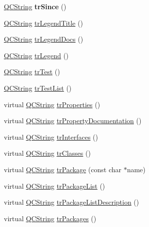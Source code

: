 \begin{DoxyCompactItemize}
\item 
\hypertarget{class_translator_polish_a20d10919ba8fcb87ea8aff4d2cb6f37d}{\hyperlink{class_q_c_string}{Q\-C\-String} {\bfseries tr\-Since} ()}\label{class_translator_polish_a20d10919ba8fcb87ea8aff4d2cb6f37d}

\item 
\hyperlink{class_q_c_string}{Q\-C\-String} \hyperlink{class_translator_polish_a7f4f24b82bfe41aeccff7758ce877838}{tr\-Legend\-Title} ()
\item 
\hyperlink{class_q_c_string}{Q\-C\-String} \hyperlink{class_translator_polish_a36810de513b643c28c93dd0873812891}{tr\-Legend\-Docs} ()
\item 
\hyperlink{class_q_c_string}{Q\-C\-String} \hyperlink{class_translator_polish_ac9030d6b3e6b640a112dcb18298f4494}{tr\-Legend} ()
\item 
\hyperlink{class_q_c_string}{Q\-C\-String} \hyperlink{class_translator_polish_a9a6cd1fdbadb3328f2a1158928d84d6e}{tr\-Test} ()
\item 
\hyperlink{class_q_c_string}{Q\-C\-String} \hyperlink{class_translator_polish_ab52ca375095ff8ebc3132b990b37a796}{tr\-Test\-List} ()
\item 
virtual \hyperlink{class_q_c_string}{Q\-C\-String} \hyperlink{class_translator_polish_a28f852553c146863a0b8ce5a215a9a1f}{tr\-Properties} ()
\item 
virtual \hyperlink{class_q_c_string}{Q\-C\-String} \hyperlink{class_translator_polish_aa7f233a7014c4b561ebbedc8b76a7bd8}{tr\-Property\-Documentation} ()
\item 
virtual \hyperlink{class_q_c_string}{Q\-C\-String} \hyperlink{class_translator_polish_a3e32b2fdb1d61783cd0fa4734beed3da}{tr\-Interfaces} ()
\item 
virtual \hyperlink{class_q_c_string}{Q\-C\-String} \hyperlink{class_translator_polish_a4bc1d444e897ace8e0e1e75590b879d3}{tr\-Classes} ()
\item 
virtual \hyperlink{class_q_c_string}{Q\-C\-String} \hyperlink{class_translator_polish_a071fcb3177ebad975ba6f5931439b3ee}{tr\-Package} (const char $\ast$name)
\item 
virtual \hyperlink{class_q_c_string}{Q\-C\-String} \hyperlink{class_translator_polish_a777a67065ae7cc0fd32c0620ea1d3fdb}{tr\-Package\-List} ()
\item 
virtual \hyperlink{class_q_c_string}{Q\-C\-String} \hyperlink{class_translator_polish_aafd776ddbb24f5b3cf7c2f39c80f8652}{tr\-Package\-List\-Description} ()
\item 
virtual \hyperlink{class_q_c_string}{Q\-C\-String} \hyperlink{class_translator_polish_a5b648094fc927e3078e9af28c26f8bba}{tr\-Packages} ()

\end{DoxyCompactItemize}
